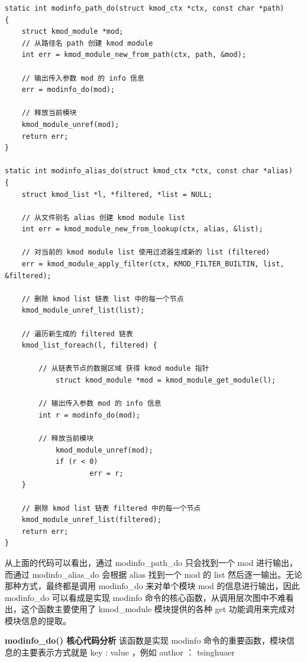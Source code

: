 \documentclass[11pt,a4paper]{article}
\begin{document}
{\begin{shaded}\begin{verbatim}
static int modinfo_path_do(struct kmod_ctx *ctx, const char *path)
{
    struct kmod_module *mod;
    // 从路径名 path 创建 kmod module
    int err = kmod_module_new_from_path(ctx, path, &mod);

    // 输出传入参数 mod 的 info 信息
    err = modinfo_do(mod);

    // 释放当前模块
    kmod_module_unref(mod);
    return err;
}

static int modinfo_alias_do(struct kmod_ctx *ctx, const char *alias)
{
    struct kmod_list *l, *filtered, *list = NULL;

    // 从文件别名 alias 创建 kmod module list
    int err = kmod_module_new_from_lookup(ctx, alias, &list);

    // 对当前的 kmod module list 使用过滤器生成新的 list (filtered)
    err = kmod_module_apply_filter(ctx, KMOD_FILTER_BUILTIN, list, &filtered);

    // 删除 kmod list 链表 list 中的每一个节点
    kmod_module_unref_list(list);

    // 遍历新生成的 filtered 链表
    kmod_list_foreach(l, filtered) {

        // 从链表节点的数据区域 获得 kmod module 指针
            struct kmod_module *mod = kmod_module_get_module(l);

        // 输出传入参数 mod 的 info 信息             
        int r = modinfo_do(mod);

        // 释放当前模块
            kmod_module_unref(mod);
            if (r < 0)
                    err = r;
    }

    // 删除 kmod list 链表 filtered 中的每一个节点
    kmod_module_unref_list(filtered);
    return err;
}
\end{verbatim}\end{shaded}}
从上面的代码可以看出，通过 modinfo\_path\_do 只会找到一个 mod
进行输出，而通过 modinfo\_alias\_do 会根据 alias 找到一个 mod 的 list
然后逐一输出。无论那种方式，最终都是调用 modinfo\_do 来对单个模块 mod
的信息进行输出，因此 modinfo\_do 可以看成是实现 modinfo
命令的核心函数，从调用层次图中不难看出，这个函数主要使用了 kmod\_module
模块提供的各种 get 功能调用来完成对模块信息的提取。

\textbf{modinfo\_do() 核心代码分析} 该函数是实现 modinfo
命令的重要函数，模块信息的主要表示方式就是 key : value ，例如 author ：
tsinghuaer
\end{document}
